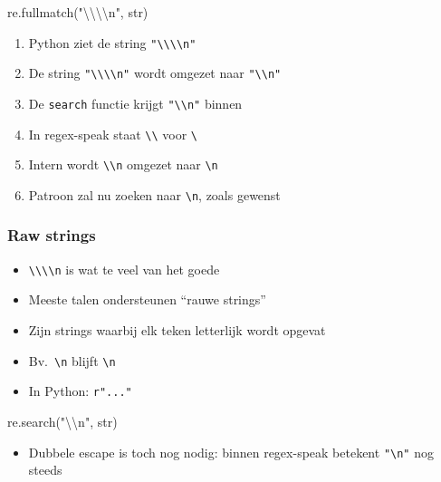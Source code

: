 \begin{frame}
\begin{overprint}
    \begin{center} \ttfamily
      re.fullmatch("\textbackslash\textbackslash\textbackslash\textbackslash n", str)
    \end{center}
    \begin{enumerate}
      \item Python ziet de string \texttt{"\textbackslash\textbackslash\textbackslash\textbackslash n"}
      \item De string \texttt{"\textbackslash\textbackslash\textbackslash\textbackslash n"} wordt omgezet naar \texttt{"\textbackslash\textbackslash n"}
      \item De \texttt{search} functie krijgt \texttt{"\textbackslash\textbackslash n"} binnen
      \item In regex-speak staat \texttt{\textbackslash\textbackslash} voor \texttt{\textbackslash}
      \item Intern wordt \texttt{\textbackslash\textbackslash n} omgezet naar \texttt{\textbackslash n}
      \item Patroon zal nu zoeken naar \texttt{\textbackslash n}, zoals gewenst
    \end{enumerate}
  \end{overprint}
\end{frame}

\begin{frame}
  \frametitle{Raw strings}
  \begin{itemize}
    \item \texttt{\textbackslash\textbackslash\textbackslash\textbackslash n} is wat te veel van het goede
    \item Meeste talen ondersteunen ``rauwe strings''
    \item Zijn strings waarbij elk teken letterlijk wordt opgevat
    \item Bv.~\texttt{\textbackslash n} blijft \texttt{\textbackslash n}
    \item In Python: \texttt{r"..."}
  \end{itemize}
  \begin{center} \ttfamily
    re.search("\textbackslash\textbackslash n", str)
  \end{center}
  \begin{itemize}
    \item Dubbele escape is toch nog nodig: binnen regex-speak betekent \texttt{"\textbackslash n"} nog steeds 
  \end{itemize}
\end{frame}

